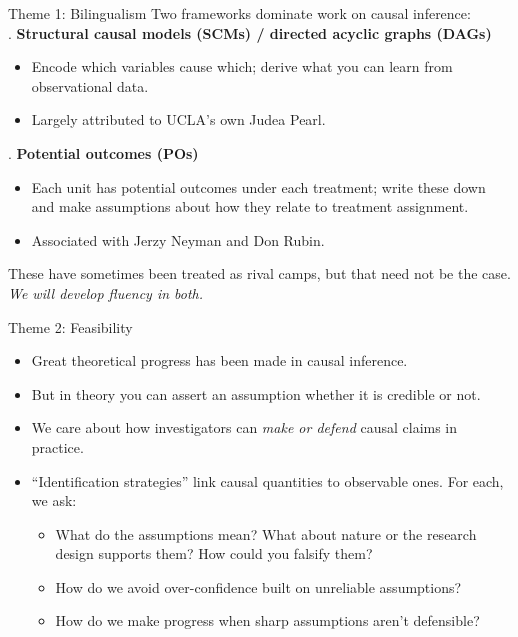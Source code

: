 \documentclass[xcolor=dvipsnames]{beamer}
\begin{document}

\begin{frame}{Theme 1: Bilingualism}
 Two frameworks dominate work on causal inference:\\
\medskip
{}. \textbf{Structural causal models (SCMs) / directed acyclic graphs (DAGs)}
\small
\begin{itemize}
\item Encode which variables cause which; derive what you can learn from observational data.
\item Largely attributed to UCLA's own Judea Pearl.
\end{itemize}
\bigskip
\normalsize
{}. \textbf{Potential outcomes (POs)}
\small
\begin{itemize}
\item Each unit has potential outcomes under each treatment; write these down and make assumptions about how they relate to treatment assignment.
\item Associated with Jerzy Neyman and Don Rubin.
\end{itemize}

\normalsize
\begin{center} These have sometimes been treated as rival camps, but that need not be the case. \textit{We will develop fluency in both.}
\end{center}
\end{frame}

\begin{frame}{Theme 2: Feasibility}
\small
\begin{itemize}
\item<1-> Great theoretical progress has been made in causal inference.
\medskip
\item<2-> But in theory you can assert an assumption whether it is credible or not.
\medskip
\item<3-> We care about how investigators can \textit{make or defend} causal claims in practice.
\medskip
\item<4-> ``Identification strategies'' link causal quantities to observable ones. For each, we ask:
\footnotesize
\begin{itemize}
\item What do the assumptions mean? What about nature or the research design supports them? How could you falsify them? \\
\item How do we avoid over-confidence built on unreliable assumptions? \\
\item How do we make progress when sharp assumptions aren't defensible?
\end{itemize}
\end{itemize}
\end{frame}
\end{document}
